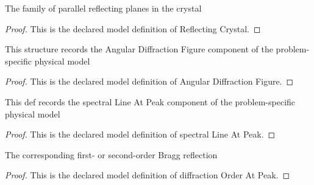 \begin{definition}
  \label{def:physics:phyx-mini-0081:phyxminiproblems-problemphyxmini0081-reflectingcrystal}
  The family of parallel reflecting planes in the crystal
\end{definition}
\begin{proof}
  This is the declared model definition of Reflecting Crystal.
\end{proof}
\begin{definition}
  \label{def:physics:phyx-mini-0081:phyxminiproblems-problemphyxmini0081-angulardiffractionfigure}
  This structure records the Angular Diffraction Figure component of the problem-specific physical model
\end{definition}
\begin{proof}
  This is the declared model definition of Angular Diffraction Figure.
\end{proof}
\begin{definition}
  \label{def:physics:phyx-mini-0081:phyxminiproblems-problemphyxmini0081-spectrallineatpeak}
  This def records the spectral Line At Peak component of the problem-specific physical model
\end{definition}
\begin{proof}
  This is the declared model definition of spectral Line At Peak.
\end{proof}
\begin{definition}
  \label{def:physics:phyx-mini-0081:phyxminiproblems-problemphyxmini0081-diffractionorderatpeak}
  The corresponding first- or second-order Bragg reflection
\end{definition}
\begin{proof}
  This is the declared model definition of diffraction Order At Peak.
\end{proof}
